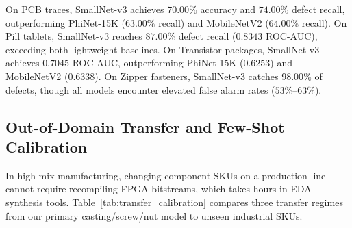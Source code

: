 \documentclass[conference]{IEEEtran}
\begin{document}
On PCB traces, SmallNet-v3 achieves $70.00\%$ accuracy and $74.00\%$ defect recall, outperforming PhiNet-15K ($63.00\%$ recall) and MobileNetV2 ($64.00\%$ recall). On Pill tablets, SmallNet-v3 reaches $87.00\%$ defect recall ($0.8343$ ROC-AUC), exceeding both lightweight baselines. On Transistor packages, SmallNet-v3 achieves $0.7045$ ROC-AUC, outperforming PhiNet-15K ($0.6253$) and MobileNetV2 ($0.6338$). On Zipper fasteners, SmallNet-v3 catches $98.00\%$ of defects, though all models encounter elevated false alarm rates ($53\%\text{--}63\%$).

\subsection{Out-of-Domain Transfer and Few-Shot Calibration}
In high-mix manufacturing, changing component SKUs on a production line cannot require recompiling FPGA bitstreams, which takes hours in EDA synthesis tools. Table~\ref{tab:transfer_calibration} compares three transfer regimes from our primary casting/screw/nut model to unseen industrial SKUs.

\begin{table}[t]
\centering
\caption{Out-of-Domain Transfer: Zero-Shot vs. Frozen-Backbone Head Calibration vs. Full Fine-Tuning}
\label{tab:transfer_calibration}
\end{table}
\end{document}
